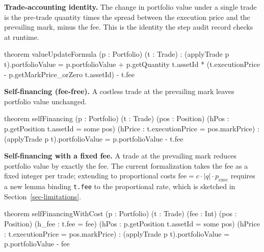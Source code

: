 \documentclass[
  11pt,
  letterpaper,
  DIV=12,
  numbers=noendperiod]{scrartcl}
\newenvironment{Shaded}{\begin{snugshade}}{\end{snugshade}}
\newcommand{\NormalTok}[1]{\textcolor[rgb]{0.00,0.23,0.31}{#1}}
\numberwithin{equation}{section}
\numberwithin{figure}{section}
\numberwithin{table}{section}
\begin{document}
\textbf{Trade-accounting identity.} The change in portfolio value under
a single trade is the pre-trade quantity times the spread between the
execution price and the prevailing mark, minus the fee. This is the
identity the step audit record checks at runtime.

\begin{Shaded}
\begin{Highlighting}[]
\NormalTok{theorem valueUpdateFormula (p : Portfolio) (t : Trade) :}
\NormalTok{    (applyTrade p t).portfolioValue =}
\NormalTok{      p.portfolioValue}
\NormalTok{        + p.getQuantity t.assetId}
\NormalTok{          * (t.executionPrice {-} p.getMarkPrice\_orZero t.assetId)}
\NormalTok{        {-} t.fee}
\end{Highlighting}
\end{Shaded}

\textbf{Self-financing (fee-free).} A costless trade at the prevailing
mark leaves portfolio value unchanged.

\begin{Shaded}
\begin{Highlighting}[]
\NormalTok{theorem selfFinancing (p : Portfolio) (t : Trade) (pos : Position)}
\NormalTok{    (hPos   : p.getPosition t.assetId = some pos)}
\NormalTok{    (hPrice : t.executionPrice = pos.markPrice) :}
\NormalTok{    (applyTrade p t).portfolioValue = p.portfolioValue {-} t.fee}
\end{Highlighting}
\end{Shaded}

\textbf{Self-financing with a fixed fee.} A trade at the prevailing mark
reduces portfolio value by exactly the fee. The current formalization
takes the fee as a fixed integer per trade; extending to proportional
costs \(\text{fee} = c \cdot |q| \cdot p_{\text{exec}}\) requires a new
lemma binding \texttt{t.fee} to the proportional rate, which is sketched
in Section~\ref{sec-limitations}.

\begin{Shaded}
\begin{Highlighting}[]
\NormalTok{theorem selfFinancingWithCost (p : Portfolio) (t : Trade) (fee : Int)}
\NormalTok{    (pos : Position)}
\NormalTok{    (h\_fee  : t.fee = fee)}
\NormalTok{    (hPos   : p.getPosition t.assetId = some pos)}
\NormalTok{    (hPrice : t.executionPrice = pos.markPrice) :}
\NormalTok{    (applyTrade p t).portfolioValue = p.portfolioValue {-} fee}
\end{Highlighting}
\end{Shaded}
\end{document}
